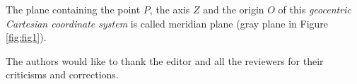 \documentclass[extra]{gji}
\begin{document}
The plane containing the point $P$, the axis $Z$ and
the origin $O$ of this \textit{geocentric Cartesian coordinate system}
is called meridian plane (gray plane in Figure \ref{fig:fig1}).

\begin{acknowledgments}
The authors would like to thank the editor and all the
reviewers for their criticisms and corrections.
\end{acknowledgments}





\appendix
%
%
%
%
\end{document}

